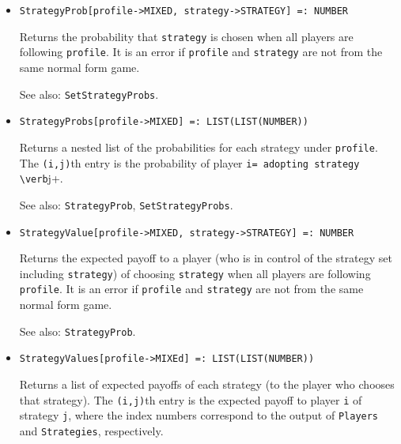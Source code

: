 \begin{itemize}
\item{}
\protect \large \begin{verbatim}
StrategyProb[profile->MIXED, strategy->STRATEGY] =: NUMBER 
\end{verbatim} \normalsize

\bd
Returns the probability that \verb+strategy+ is chosen when all
players are following \verb+profile+.  It is an error if \verb+profile+
and \verb+strategy+ are not from the same normal form game.
\item [See also:] \verb+SetStrategyProbs+.
\ed

\item{}
\protect \large \begin{verbatim}
StrategyProbs[profile->MIXED] =: LIST(LIST(NUMBER)) 
\end{verbatim} \normalsize

\bd
Returns a nested list of the probabilities for each strategy under
\verb+profile+.  The \verb+(i,j)+th entry is the probability of player
\verb+i= adopting strategy \verb+j+.
\item [See also:] \verb+StrategyProb+, \verb+SetStrategyProbs+.
\ed

\item{}
\protect \large \begin{verbatim}
StrategyValue[profile->MIXED, strategy->STRATEGY] =: NUMBER 
\end{verbatim}\normalsize

\bd 
Returns the expected payoff to a player (who is in control of the
strategy set including \verb+strategy+) of choosing \verb+strategy+ when
all players are following \verb+profile+.  It is an error if
\verb+profile+ and \verb+strategy+ are not from the same normal form
game.
\item [See also:] \verb+StrategyProb+. 
\ed

\item{}
\protect \large \begin{verbatim}
StrategyValues[profile->MIXEd] =: LIST(LIST(NUMBER)) 
\end{verbatim}\normalsize

\bd
Returns a list of expected payoffs of each strategy (to the player
who chooses that strategy).  The \verb+(i,j)+th entry is
the expected payoff to player \verb+i+ of
strategy \verb+j+, where the index numbers correspond to the output of
\verb+Players+ and \verb+Strategies+, respectively.
\ed


\end{itemize}
